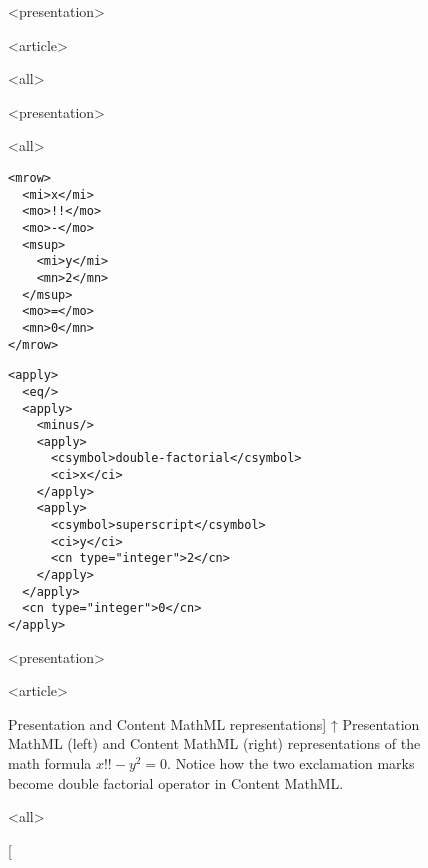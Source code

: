\begin{figure}

\begingroup

\mode
<presentation>

\vspace*{-4.1em}

\mode
<article>

\makeatletter
\let\bfseries\thesis@bfseries@old
\makeatother

\mode
<all>

\centering
\begin{minipage}{0.27\textwidth}

\mode
<presentation>

\vspace*{3.75em}

\mode
<all>

\begin{verbatim}
<mrow>
  <mi>x</mi>
  <mo>!!</mo>
  <mo>-</mo>
  <msup>
    <mi>y</mi>
    <mn>2</mn>
  </msup>
  <mo>=</mo>
  <mn>0</mn>
</mrow>
\end{verbatim}
\end{minipage}%
\begin{minipage}{0.73\textwidth}
\begin{verbatim}
<apply>
  <eq/>
  <apply>
    <minus/>
    <apply>
      <csymbol>double-factorial</csymbol>
      <ci>x</ci>
    </apply>
    <apply>
      <csymbol>superscript</csymbol>
      <ci>y</ci>
      <cn type="integer">2</cn>
    </apply>
  </apply>
  <cn type="integer">0</cn>
</apply>
\end{verbatim}
\end{minipage}
\endgroup

\mode
<presentation>

\caption
  {Presentation MathML (left) and Content MathML (right)
   representations of $x!! - y^2 = 0$.}

\mode
<article>

\caption
  [Presentation and Content MathML representations]%
  {↑ Presentation MathML (left) and Content MathML (right)
   representations of the math formula $x!! - y^2 = 0$. Notice how the two
   exclamation marks become double factorial operator in Content MathML.
   \cite[Figure 2]{novotny2020three}}

\mode
<all>

\label{fig:pmml-and-cmml}
\end{figure}